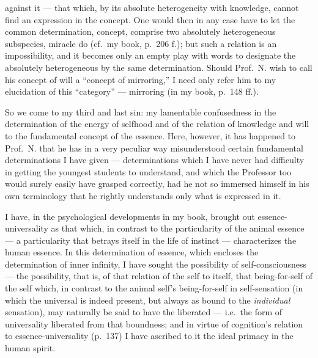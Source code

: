 \documentclass[12pt,a4paper]{book}
\begin{document}
against it --- that which, by its absolute heterogeneity with knowledge, cannot
find an expression in the concept. One would then in any case have to let the
common determination, concept, comprise two absolutely heterogeneous
subspecies,
miracle do (cf.\ my book, p.\ 206 f.); but such a relation is an impossibility,
and it becomes only an empty play with words to designate the absolutely
heterogeneous by the same determination. Should Prof.\ N. wish to call his
concept of will a ``concept of mirroring,'' I need only refer him to my
elucidation of this ``category'' --- mirroring (in my book, p.\ 148 ff.).

So we come to my third and last sin: my lamentable confusedness in the
determination of the energy of selfhood and of the relation of knowledge and
will to the fundamental concept of the essence. Here, however, it has happened
to Prof.\ N. that he has in a very peculiar way misunderstood certain
fundamental determinations I have given --- determinations which I have never
had difficulty in getting the youngest students to understand, and which the
Professor too would surely easily have grasped correctly, had he not so
immersed himself in his own terminology that he rightly understands only what
is expressed in it.

I have, in the psychological developments in my book, brought out
essence-universality as that which, in contrast
to the particularity of the animal essence --- a particularity that betrays
itself in the life of instinct --- characterizes the human essence.
In this determination of essence, which encloses the determination of inner
infinity, I have sought the possibility of self-consciousness --- the
possibility, that is, of that relation of the self to itself, that being-for-self
of the self which, in contrast to the animal self's being-for-self in
self-sensation (in which the universal is indeed present, but always as bound to
the \emph{individual} sensation), may naturally be said to have the liberated
--- i.e.\ the form of universality liberated from that boundness; and in virtue
of cognition's relation to essence-universality (p.\ 137) I have ascribed to it
the ideal primacy in the human spirit.
\end{document}
